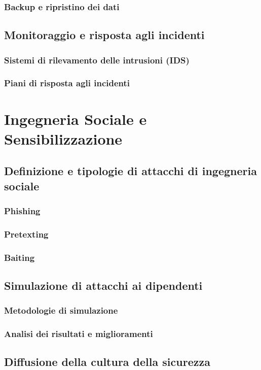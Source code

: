 \documentclass[a4paper,12pt]{book}
\begin{document}
\subsection{Backup e ripristino dei dati}
\section{Monitoraggio e risposta agli incidenti}
\subsection{Sistemi di rilevamento delle intrusioni (IDS)}
\subsection{Piani di risposta agli incidenti}

\chapter{Ingegneria Sociale e Sensibilizzazione}
\section{Definizione e tipologie di attacchi di ingegneria sociale}
\subsection{Phishing}
\subsection{Pretexting}
\subsection{Baiting}
\section{Simulazione di attacchi ai dipendenti}
\subsection{Metodologie di simulazione}
\subsection{Analisi dei risultati e miglioramenti}
\section{Diffusione della cultura della sicurezza}
\end{document}
